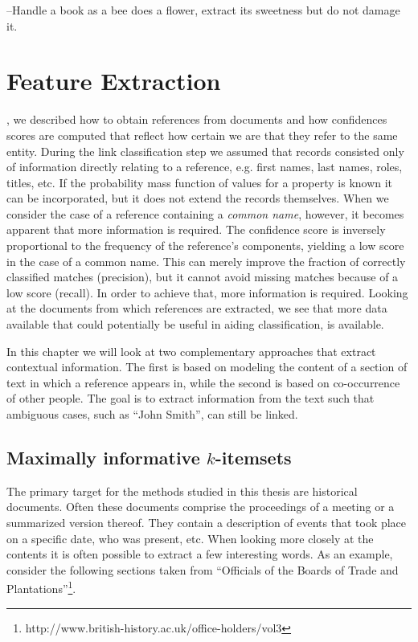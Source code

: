 \begin{savequote}[75mm] 
--Handle a book as a bee does a flower, extract its sweetness but do not damage it.
\end{savequote}




\chapter{Feature Extraction}
\label{ch:feature_extraction}

, we described how to obtain references from documents and how confidences scores are computed that reflect how certain we are that they refer to the same entity.
During the link classification step we assumed that records consisted only of information directly relating to a reference, e.g. first names, last names, roles, titles, etc.
If the probability mass function of values for a property is known it can be incorporated, but it does not extend the records themselves.
When we consider the case of a reference containing a \emph{common name}, however, it becomes apparent that more information is required.
The confidence score is inversely proportional to the frequency of the reference's components, yielding a low score in the case of a common name.
This can merely improve the fraction of correctly classified matches (precision), but it cannot avoid missing matches because of a low score (recall).
In order to achieve that, more information is required.
Looking at the documents from which references are extracted, we see that more data available that could potentially be useful in aiding classification, is available.

In this chapter we will look at two complementary approaches that extract contextual information.
The first is based on modeling the content of a section of text in which a reference appears in, while the second is based on co-occurrence of other people.
The goal is to extract information from the text such that ambiguous cases, such as ``John Smith'', can still be linked.




\section{Maximally informative $k$-itemsets}
\label{sec:miki}

The primary target for the methods studied in this thesis are historical documents.
Often these documents comprise the proceedings of a meeting or a summarized version thereof.
They contain a description of events that took place on a specific date, who was present, etc.
When looking more closely at the contents it is often possible to extract a few interesting words.
As an example, consider the following sections taken from ``Officials of the Boards of Trade and Plantations''\footnote{http://www.british-history.ac.uk/office-holders/vol3}.

